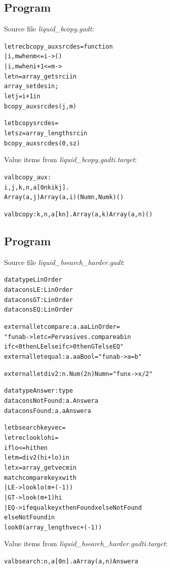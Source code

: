 \documentclass{article}
\newcommand{\tmem}[1]{{\em #1\/}}
\newcommand{\tmverbatim}[1]{{\ttfamily{#1}}}
\newenvironment{tmcode}[1][]{\begin{alltt}}{\end{alltt}}
\begin{document}
\subsection{Program \tmverbatim{bcopy}}

Source file {\tmem{liquid\_bcopy.gadt}}:
\begin{tmcode}
let rec bcopy_aux src des = function
  | i, m when m <= i -> ()
  | i, m when i+1 <= m ->
      let n = array_get src i in
      array_set des i n;
      let j = i + 1 in
      bcopy_aux src des (j, m)

let bcopy src des =
  let sz = array_length src in
  bcopy_aux src des (0, sz)
\end{tmcode}
Value items from {\tmem{liquid\_bcopy.gadti.target}}:
\begin{tmcode}
val bcopy_aux :
   i, j, k, n, a[0  n  k  i  k  j].
   Array (a, j)  Array (a, i)  (Num n, Num k)  ()

val bcopy : k, n, a[k  n]. Array (a, k)  Array (a, n)  ()
\end{tmcode}

\subsection{Program \tmverbatim{bsearch}}

Source file {\tmem{liquid\_bsearch\_harder.gadt}}:
\begin{tmcode}
datatype LinOrder
datacons LE : LinOrder
datacons GT : LinOrder
datacons EQ : LinOrder

external let compare : a. a  a  LinOrder =
  "fun a b -> let c = Pervasives.compare a b in
              if c < 0 then LE else if c > 0 then GT else EQ"
external let equal : a. a  a  Bool = "fun a b -> a = b"

external let div2 : n. Num (2 n)  Num n = "fun x -> x / 2"

datatype Answer : type
datacons NotFound : a. Answer a
datacons Found : a. a  Answer a

let bsearch key vec =
  let rec look lo hi =
    if lo <= hi then
        let m = div2 (hi + lo) in
        let x = array_get vec m in
        match compare key x with
          | LE -> look lo (m + (-1))
          | GT -> look (m + 1) hi
          | EQ -> if equal key x then Found x else NotFound
    else NotFound in
  look 0 (array_length vec + (-1))
\end{tmcode}
Value items from {\tmem{liquid\_bsearch\_harder.gadti.target}}:
\begin{tmcode}
val bsearch : n, a[0  n]. a  Array (a, n)  Answer a
\end{tmcode}
\end{document}
